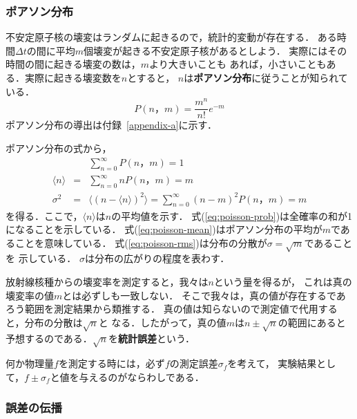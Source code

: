 \documentclass[a4j,10pt,oneside,openany]{jsbook}
\begin{document}
\subsubsection{ポアソン分布}

不安定原子核の壊変はランダムに起きるので，統計的変動が存在する．
ある時間$\Delta t$の間に平均$m$個壊変が起きる不安定原子核があるとしよう．
実際にはその時間の間に起きる壊変の数は，$m$より大きいことも
あれば，小さいこともある．実際に起きる壊変数を$n$とすると，
$n$は{\bf ポアソン分布}に従うことが知られている．
\begin{equation}
  P(n，m) = \frac{m^n}{n!}e^{-m}
  \label{eq:poisson}
\end{equation}
ポアソン分布の導出は付録~\ref{appendix-a}に示す．

ポアソン分布の式から，
\begin{eqnarray}
  && \sum_{n=0}^{\infty}P(n，m) = 1
  \label{eq:poisson-prob} \\
  \langle n \rangle &=& \sum_{n=0}^{\infty}nP(n，m)  =m
  \label{eq:poisson-mean} \\
  \sigma^2 &=& \langle(n-\langle n\rangle)^2\rangle =
  \sum_{n=0}^{\infty}(n-m)^2P(n，m) = m
  \label{eq:poisson-rms}
\end{eqnarray}
を得る．ここで，$\langle n\rangle$は$n$の平均値を示す．
式(\ref{eq:poisson-prob})は全確率の和が1になることを示している．
式(\ref{eq:poisson-mean})はポアソン分布の平均が$m$であることを意味している．
式(\ref{eq:poisson-rms})は分布の分散が$\sigma = \sqrt{m}$であることを
示している．
$\sigma$は分布の広がりの程度を表わす．

放射線核種からの壊変率を測定すると，我々は$n$という量を得るが，
これは真の壊変率の値$m$とは必ずしも一致しない．
そこで我々は，真の値が存在するであろう範囲を測定結果から類推する．
真の値は知らないので測定値で代用すると，分布の分散は$\sqrt{n}$と
なる．したがって，真の値$m$は$n\pm\sqrt{n}$の範囲にあると
予想するのである．$\sqrt{n}$を{\bf 統計誤差}という．

何か物理量$f$を測定する時には，必ず$f$の測定誤差$\sigma_f$を考えて，
実験結果として，$f\pm\sigma_f$と値を与えるのがならわしである．

\subsubsection{誤差の伝播}
\end{document}
